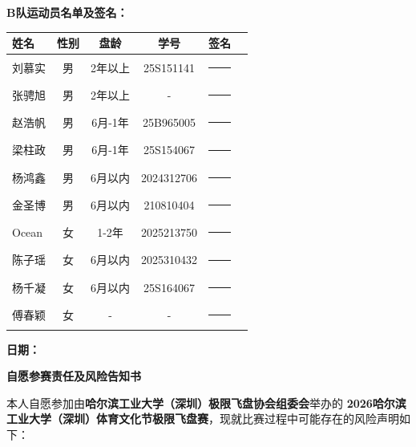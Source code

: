 \documentclass{article}
\begin{document}
\noindent \textbf{B队运动员名单及签名：} \\
\begin{center}
\small %
\renewcommand{\arraystretch}{1.5} %
\begin{tabular}{lccccl}
    \toprule
    \textbf{姓名} & \textbf{性别} & \textbf{盘龄} & \textbf{学号} & \textbf{签名} \\[3pt] %
    \midrule
    刘慕实 & 男 & 2年以上 & 25S151141 & \rule{3cm}{0.4pt} \\
    张骋旭 & 男 & 2年以上 & - & \rule{3cm}{0.4pt} \\
    赵浩帆 & 男 & 6月-1年 & 25B965005 & \rule{3cm}{0.4pt} \\
    梁柱政 & 男 & 6月-1年 & 25S154067 & \rule{3cm}{0.4pt} \\
    杨鸿鑫 & 男 & 6月以内 & 2024312706 & \rule{3cm}{0.4pt} \\
    金圣博 & 男 & 6月以内 & 210810404 & \rule{3cm}{0.4pt} \\
    Ocean & 女 & 1-2年 & 2025213750 & \rule{3cm}{0.4pt} \\
    陈子瑶 & 女 & 6月以内 & 2025310432 & \rule{3cm}{0.4pt} \\
    杨千凝 & 女 & 6月以内 & 25S164067 & \rule{3cm}{0.4pt} \\
    傅春颖 & 女 & - & - & \rule{3cm}{0.4pt} \\
    \bottomrule
\end{tabular}
\end{center}

\vspace{0.5cm} %
\noindent \textbf{日期：}
\newpage

\begin{center}
    \vspace*{0cm} %
    {\fontsize{18pt}{28pt}\selectfont\textbf{自愿参赛责任及风险告知书}} %
    \vspace{0.5cm} %
\end{center}

本人自愿参加由\textbf{哈尔滨工业大学（深圳）极限飞盘协会组委会}举办的 \textbf{2026哈尔滨工业大学（深圳）体育文化节极限飞盘赛}，现就比赛过程中可能存在的风险声明如下：
\end{document}
